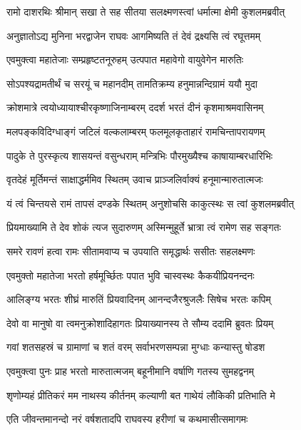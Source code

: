 \twolineshloka
{रामो दाशरथिः श्रीमान् सखा ते सह सीतया}
{सलक्ष्मणस्त्वां धर्मात्मा क्षेमी कुशलमब्रवीत्} %

\twolineshloka
{अनुज्ञातोऽद्य मुनिना भरद्वाजेन राघवः}
{आगमिष्यति तं देवं द्रक्ष्यसि त्वं रघूत्तमम्} %

\twolineshloka
{एवमुक्त्वा महातेजाः सम्प्रहृष्टतनूरुहम्}
{उत्पपात महावेगो वायुवेगेन मारुतिः} %

\twolineshloka
{सोऽपश्यद्रामतीर्थं च सरयूं च महानदीम्}
{तामतिक्रम्य हनुमान्नन्दिग्रामं ययौ मुदा} %

\twolineshloka
{क्रोशमात्रे त्वयोध्यायाश्चीरकृष्णाजिनाम्बरम्}
{ददर्श भरतं दीनं कृशमाश्रमवासिनम्} %

\twolineshloka
{मलपङ्कविदिग्धाङ्गं जटिलं वल्कलाम्बरम्}
{फलमूलकृताहारं रामचिन्तापरायणम्} %

\twolineshloka
{पादुके ते पुरस्कृत्य शासयन्तं वसुन्धराम्}
{मन्त्रिभिः पौरमुख्यैश्च काषायाम्बरधारिभिः} %

\twolineshloka
{वृतदेहं मूर्तिमन्तं साक्षाद्धर्ममिव स्थितम्}
{उवाच प्राञ्जलिर्वाक्यं हनूमान्मारुतात्मजः} %

\twolineshloka
{यं त्वं चिन्तयसे रामं तापसं दण्डके स्थितम्}
{अनुशोचसि काकुत्स्थः स त्वां कुशलमब्रवीत्} %

\twolineshloka
{प्रियमाख्यामि ते देव शोकं त्यज सुदारुणम्}
{अस्मिन्मुहूर्ते भ्रात्रा त्वं रामेण सह सङ्गतः} %

\twolineshloka
{समरे रावणं हत्वा रामः सीतामवाप्य च}
{उपयाति समृद्धार्थः ससीतः सहलक्ष्मणः} %

\twolineshloka
{एवमुक्तो महातेजा भरतो हर्षमूर्च्छितः}
{पपात भुवि चास्वस्थः कैकयीप्रियनन्दनः} %

\twolineshloka
{आलिङ्ग्य भरतः शीघ्रं मारुतिं प्रियवादिनम्}
{आनन्दजैरश्रुजलैः सिषेच भरतः कपिम्} %

\twolineshloka
{देवो वा मानुषो वा त्वमनुक्रोशादिहागतः}
{प्रियाख्यानस्य ते सौम्य ददामि ब्रुवतः प्रियम्} %

\twolineshloka
{गवां शतसहस्रं च ग्रामाणां च शतं वरम्}
{सर्वाभरणसम्पन्ना मुग्धाः कन्यास्तु षोडश} %

\twolineshloka
{एवमुक्त्वा पुनः प्राह भरतो मारुतात्मजम्}
{बहूनीमानि वर्षाणि गतस्य सुमहद्वनम्} %

\twolineshloka
{शृणोम्यहं प्रीतिकरं मम नाथस्य कीर्तनम्}
{कल्याणी बत गाथेयं लौकिकी प्रतिभाति मे} %

\twolineshloka
{एति जीवन्तमानन्दो नरं वर्षशतादपि}
{राघवस्य हरीणां च कथमासीत्समागमः} %

